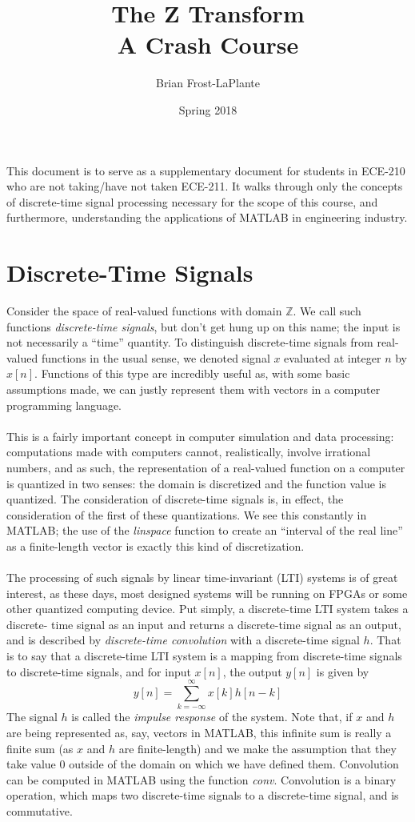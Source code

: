 \documentclass{article}
\title{The Z Transform \\
\large A Crash Course}
\author{Brian Frost-LaPlante}
\date{Spring 2018}
\begin{document}
\maketitle
\noindent This document is to serve as a supplementary document for students in ECE-210 who are not taking/have not taken ECE-211. It walks 
through only the concepts of discrete-time signal processing necessary for the scope of this course, and furthermore, understanding 
the applications of MATLAB in engineering industry.
\section*{Discrete-Time Signals}
\noindent Consider the space of real-valued functions with domain $\mathbb{Z}$. We call such functions \textit{discrete-time signals}, 
but don't get hung up on this name; the input is not necessarily a ``time'' quantity. To distinguish discrete-time signals from real-
valued functions in the usual sense, we denoted signal $x$ evaluated at integer $n$ by $x[n]$. Functions of this type are incredibly 
useful as, with some basic assumptions made, we can justly represent them with vectors in a computer programming language. \\ \\
\noindent This is a fairly important concept in computer simulation and data processing: computations made with computers cannot, 
realistically, involve irrational numbers, and as such, the representation of a real-valued function on a computer is quantized in two 
senses: the domain is discretized and the function value is quantized. The consideration of discrete-time signals is, in effect, the 
consideration of the first of these quantizations. We see this constantly in MATLAB; the use of the \textit{linspace} function to 
create an ``interval of the real line'' as a finite-length vector is exactly this kind of discretization. \\ \\
\noindent The processing of such signals by linear time-invariant (LTI) systems is of great interest, as these days, most designed 
systems will be running on FPGAs or some other quantized computing device. Put simply, a discrete-time LTI system takes a discrete-
time signal as an input and returns a discrete-time signal as an output, and is described by \textit{discrete-time convolution} with 
a discrete-time signal $h$. That is to say that a discrete-time LTI system is a mapping from discrete-time signals to discrete-time 
signals, and for input $x[n]$, the output $y[n]$ is given by
$$y[n] = \sum_{k=-\infty}^{\infty}x[k]h[n-k]$$
The signal $h$ is called the \textit{impulse response} of the system. Note that, if $x$ and $h$ are being represented as, say, 
vectors in MATLAB, this infinite sum is really a finite sum (as $x$ and $h$ are finite-length) and we make the assumption that they 
take value $0$ outside of the domain on which we have defined them. Convolution can be computed in MATLAB using the function 
\textit{conv}. Convolution is a binary operation, which maps two discrete-time signals to a discrete-time signal, and is commutative.
\end{document}

